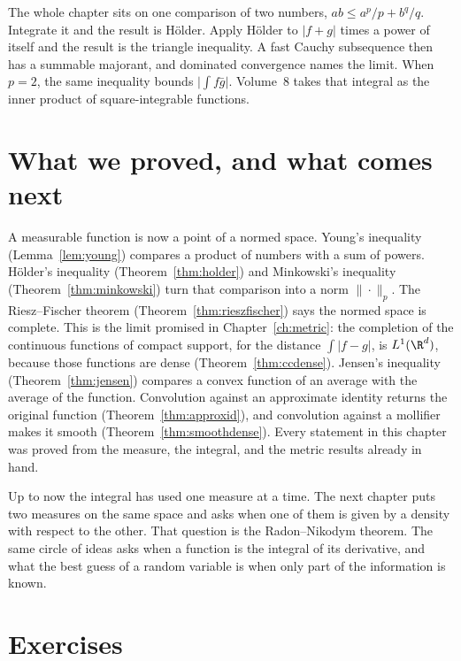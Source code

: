 \begin{beauty}
The whole chapter sits on one comparison of two numbers, $ab\le a^p/p+b^q/q$. Integrate it and the result is Hölder. Apply Hölder to $|f+g|$ times a power of itself and the result is the triangle inequality. A fast Cauchy subsequence then has a summable majorant, and dominated convergence names the limit. When $p=2$, the same inequality bounds $\bigl|\int f\bar g\bigr|$. Volume~8 takes that integral as the inner product of square-integrable functions.
\end{beauty}

\section{What we proved, and what comes next}

A measurable function is now a point of a normed space. Young's inequality (Lemma~\ref{lem:young}) compares a product of numbers with a sum of powers. Hölder's inequality (Theorem~\ref{thm:holder}) and Minkowski's inequality (Theorem~\ref{thm:minkowski}) turn that comparison into a norm $\|\cdot\|_p$. The Riesz--Fischer theorem (Theorem~\ref{thm:rieszfischer}) says the normed space is complete. This is the limit promised in Chapter~\ref{ch:metric}: the completion of the continuous functions of compact support, for the distance $\int|f-g|$, is $L^1(\R^d)$, because those functions are dense (Theorem~\ref{thm:ccdense}). Jensen's inequality (Theorem~\ref{thm:jensen}) compares a convex function of an average with the average of the function. Convolution against an approximate identity returns the original function (Theorem~\ref{thm:approxid}), and convolution against a mollifier makes it smooth (Theorem~\ref{thm:smoothdense}). Every statement in this chapter was proved from the measure, the integral, and the metric results already in hand.

Up to now the integral has used one measure at a time. The next chapter puts two measures on the same space and asks when one of them is given by a density with respect to the other. That question is the Radon--Nikodym theorem. The same circle of ideas asks when a function is the integral of its derivative, and what the best guess of a random variable is when only part of the information is known.

\section{Exercises}

